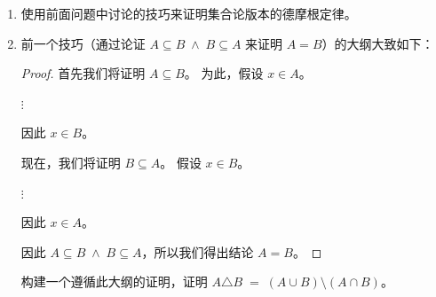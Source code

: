 \begin{enumerate}
   \wbvfill
  
  \workbookpagebreak
   
  \item 
  使用前面问题中讨论的技巧来证明集合论版本的德摩根定律。
  \wbvfill
  
  \workbookpagebreak
  
  \item 
  前一个技巧（通过论证 $A \subseteq B \; \land \; B \subseteq A$ 来证明 $A=B$）的大纲大致如下：
  
  \begin{proof} 
  
  
  首先我们将证明 $A \subseteq B$。\newline
  为此，假设 $x \in A$。
  \begin{center}
  $\vdots$
  \end{center}
  
 
  因此 $x \in B$。
  
  现在，我们将证明 $B \subseteq A$。\newline
  假设 $x \in B$。
  \begin{center}
  $\vdots$
  \end{center}
  
  
  因此 $x \in A$。
  
  因此 $A \subseteq B \; \land \; B \subseteq A$，所以我们得出结论 $A=B$。
  \end{proof}
  
  构建一个遵循此大纲的证明，证明 $A \triangle B \; = \; (A \cup B) \setminus (A \cap B)$。
  
  \wbvfill
  
  \workbookpagebreak
  
  \end{enumerate}
  
  
